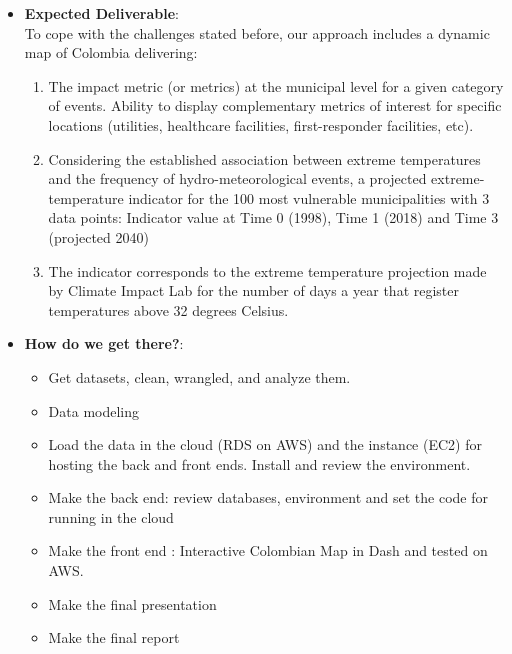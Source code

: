 \documentclass[11pt]{article}
\begin{document}
\begin{itemize}
\item \textbf{Expected Deliverable}:\\
To cope with the challenges stated before, our approach includes a dynamic map of Colombia delivering:

\begin{enumerate}
\item The impact metric (or metrics) at the municipal level for a given category of events. Ability to display complementary metrics of interest for specific locations (utilities, healthcare facilities, first-responder facilities, etc).
\item Considering the established association between extreme temperatures and the frequency of hydro-meteorological events, a projected extreme-temperature indicator for the 100 most vulnerable municipalities with 3 data points: Indicator value at Time 0 (1998), Time 1 (2018) and Time 3 (projected 2040)
\item The indicator corresponds to the extreme temperature projection made by Climate Impact Lab for the number of days a year that register temperatures above 32 degrees Celsius.
\end{enumerate}




\item \textbf{How do we get there?}:

\begin{itemize}
\item Get datasets, clean, wrangled, and analyze them.
\item Data modeling
\item Load the data in the cloud (RDS on AWS) and the instance (EC2) for hosting the back and front ends. Install and review the environment.
\item Make the back end: review databases, environment and set the code for running in the cloud
\item Make the front end : Interactive Colombian Map in Dash and tested on AWS.
\item Make the final presentation
\item Make the final report
\end{itemize}

\end{itemize}


%




\end{document}
